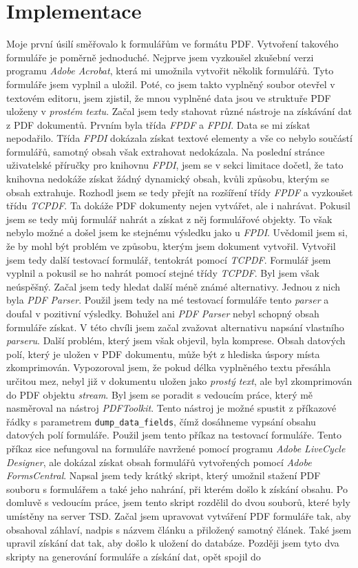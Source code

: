 \documentclass[czech,BP]{thesiskiv}
\begin{document}
\chapter{Implementace}
Moje první úsilí směřovalo k formulářům ve formátu PDF. Vytvoření takového formuláře je poměrně jednoduché. Nejprve jsem vyzkoušel zkušební verzi programu \emph{Adobe Acrobat}, která mi umožnila vytvořit několik formulářů. Tyto formuláře jsem vyplnil a uložil. Poté, co jsem takto vyplněný soubor otevřel v textovém editoru, jsem zjistil, že mnou vyplněné data jsou ve struktuře PDF uloženy v \emph{prostém textu}. Začal jsem tedy stahovat různé nástroje na získávání dat z PDF dokumentů. Prvním byla třída \emph{FPDF} a \emph{FPDI}. Data se mi získat nepodařilo. Třída \emph{FPDI} dokázala získat textové elementy a vše co nebylo součástí formulářů, samotný obsah však extrahovat nedokázala. Na poslední stránce uživatelské příručky pro knihovnu \emph{FPDI}, jsem se v sekci limitace dočetl, že tato knihovna nedokáže získat žádný dynamický obsah, kvůli způsobu, kterým se obsah extrahuje. Rozhodl jsem se tedy přejít na rozšíření třídy \emph{FPDF} a vyzkoušet třídu \emph{TCPDF}. Ta dokáže PDF dokumenty nejen vytvářet, ale i nahrávat. Pokusil jsem se tedy můj formulář nahrát a získat z něj formulářové objekty. To však nebylo možné a došel jsem ke stejnému výsledku jako u \emph{FPDI}. Uvědomil jsem si, že by mohl být problém ve způsobu, kterým jsem dokument vytvořil. Vytvořil jsem tedy další testovací formulář, tentokrát pomocí \emph{TCPDF}. Formulář jsem vyplnil a pokusil se ho nahrát pomocí stejné třídy \emph{TCPDF}. Byl jsem však neúspěšný. Začal jsem tedy hledat další méně známé alternativy. Jednou z nich byla \emph{PDF Parser}. Použil jsem tedy na mé testovací formuláře tento \emph{parser} a doufal v pozitivní výsledky. Bohužel ani \emph{PDF Parser} nebyl schopný obsah formuláře získat. V této chvíli jsem začal zvažovat alternativu napsání vlastního \emph{parseru}. Další problém, který jsem však objevil, byla komprese. Obsah datových polí, který je uložen v PDF dokumentu, může být z hlediska úspory místa zkomprimován. Vypozoroval jsem, že pokud délka vyplněného textu přesáhla určitou mez, nebyl již v dokumentu uložen jako \emph{prostý text}, ale byl zkomprimován do PDF objektu \emph{stream}. Byl jsem se poradit s vedoucím práce, který mě nasměroval na nástroj \emph{PDFToolkit}. Tento nástroj je možné spustit z příkazové řádky s parametrem \texttt{dump\_data\_fields}, čímž dosáhneme vypsání obsahu datových polí formuláře. Použil jsem tento příkaz na testovací formuláře. Tento příkaz sice nefungoval na formuláře navržené pomocí programu \emph{Adobe LiveCycle Designer}, ale dokázal získat obsah formulářů vytvořených pomocí \emph{Adobe FormsCentral}. Napsal jsem tedy krátký skript, který umožnil stažení PDF souboru s formulářem a také jeho nahrání, při kterém došlo k získání obsahu. Po domluvě s vedoucím práce, jsem tento skript rozdělil do dvou souborů, které byly umístěny na server TSD. Začal jsem upravovat vytváření PDF formuláře tak, aby obsahoval záhlaví, nadpis s názvem článku a přiložený samotný článek. Také jsem upravil získání dat tak, aby došlo k uložení do databáze. Později jsem tyto dva skripty na generování formuláře a získání dat, opět spojil do 
\end{document}
